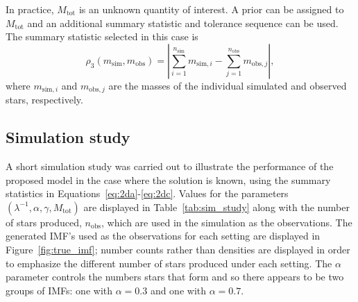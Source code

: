\documentclass[ejs]{imsart}
\numberwithin{equation}{section}
\theoremstyle{plain}
\newcommand{\msim}{m_{\text{sim}}}
\newcommand{\mobs}{m_{\text{obs}}}
\newcommand{\nsim}{n_{\text{sim}}}
\newcommand{\nobs}{n_{\text{obs}}}
\newcommand{\Mtot}{M_{\text{tot}}}
\begin{document}
In practice, $\Mtot$ is an unknown quantity of interest.  A prior can be assigned to $\Mtot$ and an additional summary statistic and tolerance sequence can be used.  The summary statistic selected in this case is
\begin{equation}
\rho_3(\msim, \mobs) = \left| \sum_{i = 1}^{\nsim} m_{\text{sim}, i} - \sum_{j = 1}^{\nobs} m_{\text{obs}, j} \right|, \label{eq:2dc}
\end{equation}
where $m_{\text{sim}, i}$ and $m_{\text{obs}, j}$ are the masses of the individual simulated and observed stars, respectively.  



\subsection{Simulation study}
A short simulation study was carried out to illustrate the performance of the proposed model in the case where the solution is known, using the summary statistics in Equations~\eqref{eq:2da}-\eqref{eq:2dc}.  Values for the parameters $(\lambda^{-1}, \alpha, \gamma, \Mtot)$ are displayed in Table~\ref{tab:sim_study} along with the number of stars produced, $\nobs$, which are used in the simulation as the observations.  The generated IMF's used as the observations for each setting are displayed in Figure~\ref{fig:true_imf}; number counts rather than densities are displayed in order to emphasize the different number of stars produced under each setting.
The $\alpha$ parameter controls the numbers stars that form and so there appears to be two groups of IMFs:  one with $\alpha = 0.3$ and one with $\alpha = 0.7$.  
\end{document}
